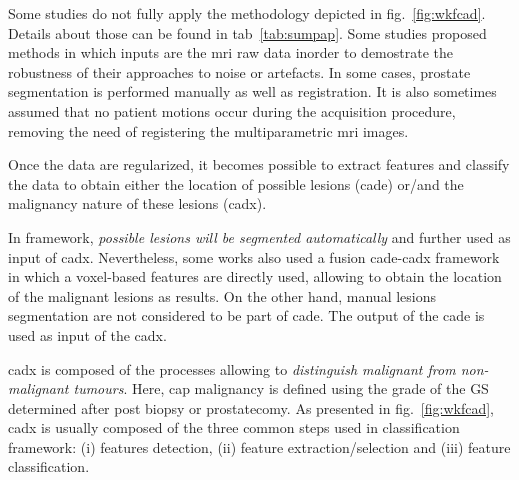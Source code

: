 Some studies do not fully apply the methodology depicted in \acs{fig}.~\ref{fig:wkfcad}.
Details about those can be found in \acs{tab}~\ref{tab:sumpap}.
Some studies proposed methods in which inputs are the \ac{mri} raw data inorder to demostrate the robustness of their approaches to noise or artefacts.
In some cases, prostate segmentation is performed manually as well as registration.
It is also sometimes assumed that no patient motions occur during the acquisition procedure, removing the need of registering the multiparametric \ac{mri} images.

Once the data are regularized, it becomes possible to extract features and classify the data to obtain either the location of possible lesions (\ac{cade}) or/and the malignancy nature of these lesions (\ac{cadx}).

In  framework, \textit{possible lesions will be segmented automatically} and further used as input of \ac{cadx}.
Nevertheless, some works also used a fusion \ac{cade}-\ac{cadx} framework in which a voxel-based features are directly used, allowing to obtain the location of the malignant lesions as results.
On the other hand, manual lesions segmentation are not considered to be part of \ac{cade}.
The output of the \ac{cade} is used as input of the \ac{cadx}.

\Ac{cadx} is composed of the processes allowing to \textit{distinguish malignant from non-malignant tumours}.
Here, \ac{cap} malignancy is defined using the grade of the GS determined after post biopsy or prostatecomy.
As presented in \ac{fig}.~\ref{fig:wkfcad}, \ac{cadx} is usually composed of the three common steps used in classification framework: (i) features detection, (ii) feature extraction/selection and (iii) feature classification.



